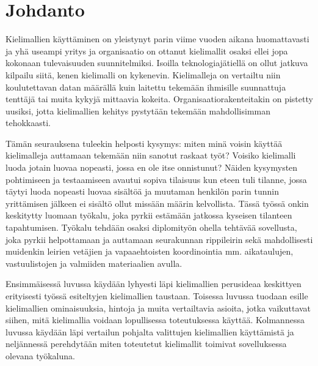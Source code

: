 \chapter{Johdanto}%
\label{ch:johdanto}

Kielimallien käyttäminen on yleistynyt parin viime vuoden aikana huomattavasti
ja yhä useampi yritys ja organisaatio on ottanut kielimallit osaksi ellei jopa
kokonaan tulevaisuuden suunnitelmiksi. Isoilla teknologiajätiellä on ollut
jatkuva kilpailu siitä, kenen kielimalli on kykenevin. Kielimalleja on
vertailtu niin koulutettavan datan määrällä kuin laitettu tekemään ihmisille
suunnattuja tenttäjä tai muita kykyjä mittaavia kokeita.
Organisaatiorakenteitakin on pistetty uusiksi, jotta kielimallien kehitys
pystytään tekemään mahdollisimman tehokkaasti.

Tämän seurauksena tuleekin helposti kysymys: miten minä voisin käyttää
kielimalleja auttamaan tekemään niin sanotut raskaat työt? Voisiko kielimalli
luoda jotain luovaa nopeasti, jossa en ole itse onnistunut? Näiden kysymysten
pohtimiseen ja testaamiseen avautui sopiva tilaisuus kun eteen tuli tilanne,
jossa täytyi luoda nopeasti luovaa sisältöä ja muutaman henkilön parin tunnin
yrittämisen jälkeen ei sisältö ollut missään määrin kelvollista. Tässä työssä
onkin keskitytty luomaan työkalu, joka pyrkii estämään jatkossa kyseisen
tilanteen tapahtumisen. Työkalu tehdään osaksi diplomityön ohella tehtävää
sovellusta, joka pyrkii helpottamaan ja auttamaan seurakunnan rippileirin sekä
mahdollisesti muidenkin leirien vetäjien ja vapaaehtoisten koordinointia mm.
aikataulujen, vastuulistojen ja valmiiden materiaalien avulla.

Ensimmäisessä luvussa käydään lyhyesti läpi kielimallien perusideaa keskittyen
erityisesti työssä esiteltyjen kielimallien taustaan. Toisessa luvussa
tuodaan esille kielimallien ominaisuuksia, hintoja ja muita vertailtavia
asioita, jotka vaikuttavat siihen, mitä kielimallia voidaan lopullisessa
toteutuksessa käyttää. Kolmannessa luvussa käydään läpi vertailun pohjalta
valittujen kielimallien käyttämistä ja neljännessä perehdytään miten toteutetut
kielimallit toimivat sovelluksessa olevana työkaluna.

